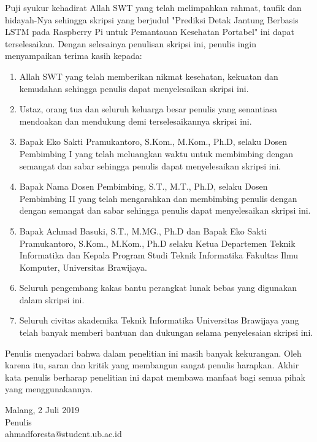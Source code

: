 \documentclass{skripsi}
\begin{document}
{\preface

  Puji syukur kehadirat Allah SWT yang telah melimpahkan rahmat,
  taufik dan hidayah-Nya sehingga skripsi yang berjudul 
  "Prediksi Detak Jantung Berbasis LSTM pada Raspberry Pi untuk
  Pemantauan Kesehatan Portabel" ini dapat terselesaikan. Dengan
  selesainya penulisan skripsi ini, penulis ingin menyampaikan terima kasih
  kepada:

  \begin{singlespace}
    \begin{enumerate}
  \item{Allah SWT yang telah memberikan nikmat kesehatan, kekuatan dan
      kemudahan sehingga penulis dapat menyelesaikan skripsi ini.}
  \item{Ustaz, orang tua dan seluruh keluarga besar penulis yang
      senantiasa mendoakan dan mendukung demi terselesaikannya skripsi
      ini.}
  \item{Bapak Eko Sakti Pramukantoro, S.Kom., M.Kom., Ph.D, selaku Dosen Pembimbing I
      yang telah meluangkan waktu untuk membimbing dengan semangat dan
      sabar sehingga penulis dapat menyelesaikan skripsi ini.}
  \item{Bapak Nama Dosen Pembimbing, S.T., M.T., Ph.D, selaku
      Dosen Pembimbing II yang telah mengarahkan dan membimbing
      penulis dengan dengan semangat dan sabar sehingga penulis dapat
      menyelesaikan skripsi ini.}
  \item {Bapak Achmad Basuki, S.T., M.MG., Ph.D dan Bapak Eko Sakti Pramukantoro, S.Kom., M.Kom., Ph.D selaku Ketua Departemen Teknik Informatika
      dan Kepala Program Studi Teknik Informatika Fakultas Ilmu
      Komputer, Universitas Brawijaya.}
  \item{Seluruh pengembang kakas bantu perangkat lunak bebas yang
      digunakan dalam skripsi ini.}
  \item{Seluruh civitas akademika Teknik Informatika Universitas
      Brawijaya yang telah banyak memberi bantuan dan dukungan selama
      penyelesaian skripsi ini.}
  \end{enumerate}
  \end{singlespace}

  Penulis menyadari bahwa dalam penelitian ini masih banyak
  kekurangan. Oleh karena itu, saran dan kritik yang membangun sangat
  penulis harapkan. Akhir kata penulis berharap penelitian ini dapat
  membawa manfaat bagi semua pihak yang menggunakannya.

  \vspace{0.8cm}

  \noindent
  \hspace*{8cm}Malang, 2 Juli 2019  
  \vspace{1.5cm} \\
  \hspace*{8cm}Penulis \\
  \hspace*{8cm}ahmadforesta@student.ub.ac.id
}
\end{document}
